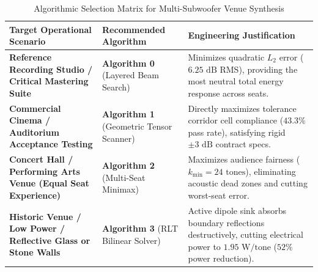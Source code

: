 \documentclass[11pt,a4paper,titlepage]{article}
\begin{document}
\begin{table}[h!]
\centering
\small
\renewcommand{\arraystretch}{1.3}
\caption{Algorithmic Selection Matrix for Multi-Subwoofer Venue Synthesis}
\label{tab:selection_matrix}
\begin{tabularx}{\textwidth}{|p{4.6cm}|p{4.2cm}|X|}
\hline
\textbf{Target Operational Scenario} & \textbf{Recommended Algorithm} & \textbf{Engineering Justification} \\ \hline
\textbf{Reference Recording Studio / Critical Mastering Suite} & \textbf{Algorithm 0} \newline (Layered Beam Search) & Minimizes quadratic $L_2$ error ($6.25\text{ dB}$ RMS), providing the most neutral total energy response across seats. \\ \hline
\textbf{Commercial Cinema / Auditorium Acceptance Testing} & \textbf{Algorithm 1} \newline (Geometric Tensor Scanner) & Directly maximizes tolerance corridor cell compliance ($43.3\%$ pass rate), satisfying rigid $\pm 3\text{ dB}$ contract specs. \\ \hline
\textbf{Concert Hall / Performing Arts Venue (Equal Seat Experience)} & \textbf{Algorithm 2} \newline (Multi-Seat Minimax) & Maximizes audience fairness ($k_{\min} = 24\text{ tones}$), eliminating acoustic dead zones and cutting worst-seat error. \\ \hline
\textbf{Historic Venue / Low Power / Reflective Glass or Stone Walls} & \textbf{Algorithm 3} \newline (RLT Bilinear Solver) & Active dipole sink absorbs boundary reflections destructively, cutting electrical power to $1.95\text{ W/tone}$ ($52\%$ power reduction). \\ \hline
\end{tabularx}
\end{table}
\end{document}
